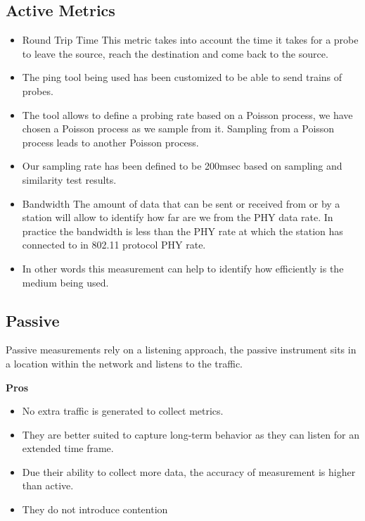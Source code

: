 \subsection*{Active Metrics}

\begin{itemize}
	\item Round Trip Time\newline
	This metric takes into account the time it takes for a probe to leave the source, reach the destination and come back to the source. 
	\item The ping tool being used has been customized to be able to send trains of probes.
	\item The tool allows to define a probing rate based on a Poisson process, we have chosen a Poisson process as we sample from it. Sampling from a Poisson process leads to another Poisson process.
	\item Our sampling rate has been defined to be 200msec based on sampling and similarity test results.
	
	\item Bandwidth
	The amount of data that can be sent or received from or by a station will allow to identify how far are we from the PHY data rate. In practice the bandwidth is less than the PHY rate at which the station has connected to in 802.11 protocol PHY rate.
	\item In other words this measurement can help to identify how efficiently is the medium being used.
	
	
\end{itemize}

\subsection*{Passive}

Passive measurements rely on a listening approach, the passive instrument sits in a location within the network and listens to the traffic. 

\textbf{Pros}
\begin{itemize}
	\item No extra traffic is generated to collect metrics.
	\item They are better suited to capture long-term behavior as they can listen for an extended time frame.
	\item Due their ability to collect more data, the accuracy of measurement is higher than active.
	\item They do not introduce contention

\end{itemize}


